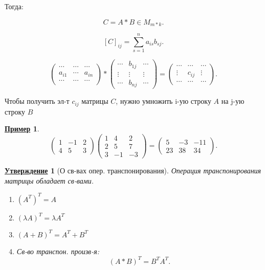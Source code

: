 \documentclass[12pt]{article}
\newtheorem{statement}{\underline{Утверждение}}[section]
\newtheorem*{example}{\underline{Пример}}
\theoremstyle{definition}
\theoremstyle{definition}
\begin{document}
Тогда:

\[
    C = A * B \in M_{m * k}
.\] 

\[
    [C]_{ij} = \sum_{s = 1}^{n} a_{is} b_{sj}
.\] 

\[
    \begin{pmatrix} \cdots & \cdots  & \cdots \\
a_{i1} & \cdots & a_{in} \\
\cdots & \cdots & \cdots \end{pmatrix} * 
    \begin{pmatrix} \cdots & b_{1j} & \cdots \\
        \vdots & \vdots & \vdots \\
        \cdots & b_{nj} & \cdots 
\end{pmatrix} = 
        \begin{pmatrix} \cdots & \cdots & \cdots \\
          \vdots & c_{ij} & \vdots \\
          \cdots & \cdots & \cdots \end{pmatrix}
.\] 

Чтобы получить эл-т $c_{ij}$ матрицы $C$, нужно умножить i-ую строку $A$ на j-ую строку $B$

\begin{example}
\[
    \begin{pmatrix} 1 & -1 & 2 \\ 4 & 5 & 3 \end{pmatrix} \begin{pmatrix} 1 & 4 & 2 \\ 2 & 5 & 7 \\ 3 & -1 & -3 \end{pmatrix} = \begin{pmatrix}  5 & -3 & -11 \\ 23 & 38 & 34  \end{pmatrix}
.\] 
\end{example}

\begin{statement}[О св-вах опер. транспонирования]
Операция транспонирования матрицы обладает св-вами.
\begin{enumerate}
    \item $(A^{T})^{T} = A$
    \item $(\lambda A) ^{T} = \lambda A^{T}$
    \item $(A + B)^{T} = A^{T} + B^{T}$
    \item Св-во транспон. произв-я:
        \[
            (A * B)^{T} = B^{T}A^{T}
        .\] 
\end{enumerate}
\end{statement}
\end{document}
